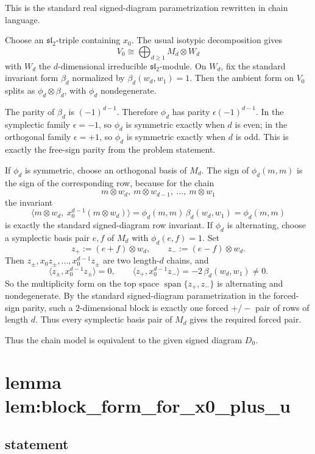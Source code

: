 \documentclass[
]{article}
\begin{document}
This is the standard real signed-diagram parametrization rewritten in
chain language.

Choose an \(\mathfrak{sl}_2\)-triple containing \(x_0\). The usual
isotypic decomposition gives \[
V_0\cong \bigoplus_{d\ge 1} M_d\otimes W_d
\] with \(W_d\) the \(d\)-dimensional irreducible
\(\mathfrak{sl}_2\)-module. On \(W_d\), fix the standard invariant form
\(\beta_d\) normalized by \(\beta_d(w_d,w_1)=1\). Then the ambient form
on \(V_0\) splits as \(\phi_d\otimes \beta_d\), with \(\phi_d\)
nondegenerate.

The parity of \(\beta_d\) is \((-1)^{d-1}\). Therefore \(\phi_d\) has
parity \(\epsilon(-1)^{d-1}\). In the symplectic family \(\epsilon=-1\),
so \(\phi_d\) is symmetric exactly when \(d\) is even; in the orthogonal
family \(\epsilon=+1\), so \(\phi_d\) is symmetric exactly when \(d\) is
odd. This is exactly the free-sign parity from the problem statement.

If \(\phi_d\) is symmetric, choose an orthogonal basis of \(M_d\). The
sign of \(\phi_d(m,m)\) is the sign of the corresponding row, because
for the chain \[
m\otimes w_d,\ m\otimes w_{d-1},\ \dots,\ m\otimes w_1
\] the invariant \[
\langle m\otimes w_d,\ x_0^{d-1}(m\otimes w_d)\rangle
=
\phi_d(m,m)\,\beta_d(w_d,w_1)
=
\phi_d(m,m)
\] is exactly the standard signed-diagram row invariant. If \(\phi_d\)
is alternating, choose a symplectic basis pair \(e,f\) of \(M_d\) with
\(\phi_d(e,f)=1\). Set \[
z_+:=(e+f)\otimes w_d,\qquad z_-:=(e-f)\otimes w_d.
\] Then \(z_\pm,x_0z_\pm,\dots,x_0^{d-1}z_\pm\) are two length-\(d\)
chains, and \[
\langle z_\pm,x_0^{d-1}z_\pm\rangle=0,\qquad
\langle z_+,x_0^{d-1}z_-\rangle=-2\,\beta_d(w_d,w_1)\neq 0.
\] So the multiplicity form on the top space
\(\operatorname{span}\{z_+,z_-\}\) is alternating and nondegenerate. By
the standard signed-diagram parametrization in the forced-sign parity,
such a \(2\)-dimensional block is exactly one forced \(+/-\) pair of
rows of length \(d\). Thus every symplectic basis pair of \(M_d\) gives
the required forced pair.

Thus the chain model is equivalent to the given signed diagram \(D_0\).

\section{lemma
lem:block\_form\_for\_x0\_plus\_u}\label{lemma-lemblock_form_for_x0_plus_u}

\subsection{statement}\label{statement-2}
\end{document}
